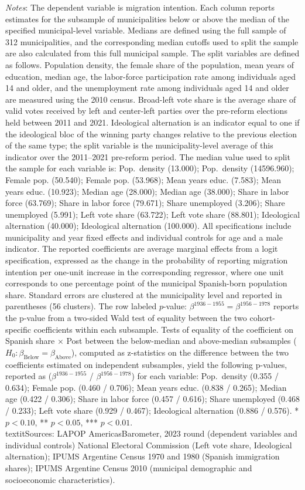 \begin{table}[!h]
\caption*{\footnotesize \textit{Notes}: The dependent variable is migration intention. Each column reports estimates for the subsample of municipalities below or above the median of the specified municipal-level variable. Medians are defined using the full sample of 312 municipalities, and the corresponding median cutoffs used to split the sample are also calculated from this full municipal sample. The split variables are defined as follows. Population density, the female share of the population, mean years of education, median age, the labor-force participation rate among individuals aged 14 and older, and the unemployment rate among individuals aged 14 and older are measured using the 2010 census. Broad-left vote share is the average share of valid votes received by left and center-left parties over the pre-reform elections held between 2011 and 2021. Ideological alternation is an indicator equal to one if the ideological bloc of the winning party changes relative to the previous election of the same type; the split variable is the municipality-level average of this indicator over the 2011--2021 pre-reform period. The median value used to split the sample for each variable is: Pop.\ density (13.000); Pop.\ density (14596.960); Female pop. (50.540); Female pop. (53.968); Mean years educ. (7.583); Mean years educ. (10.923); Median age (28.000); Median age (38.000); Share in labor force (63.769); Share in labor force (79.671); Share unemployed (3.206); Share unemployed (5.991); Left vote share (63.722); Left vote share (88.801); Ideological alternation (40.000); Ideological alternation (100.000). All specifications include municipality and year fixed effects and individual controls for age and a male indicator. The reported coefficients are average marginal effects from a logit specification, expressed as the change in the probability of reporting migration intention per one-unit increase in the corresponding regressor, where one unit corresponds to one percentage point of the municipal Spanish-born population share. Standard errors are clustered at the municipality level and reported in parentheses (56 clusters). The row labeled $p$-value: $\beta^{1936-1955} = \beta^{1956-1978}$ reports the p-value from a two-sided Wald test of equality between the two cohort-specific coefficients within each subsample. Tests of equality of the coefficient on Spanish share $\times$ Post between the below-median and above-median subsamples ($H_0: \beta_{\text{Below}} = \beta_{\text{Above}}$), computed as z-statistics on the difference between the two coefficients estimated on independent subsamples, yield the following p-values, reported as ($\beta^{1936-1955}$ / $\beta^{1956-1978}$) for each variable: Pop.\ density (0.355 / 0.634); Female pop. (0.460 / 0.706); Mean years educ. (0.838 / 0.265); Median age (0.422 / 0.306); Share in labor force (0.457 / 0.616); Share unemployed (0.468 / 0.233); Left vote share (0.929 / 0.467); Ideological alternation (0.886 / 0.576). * $p<0.10$, ** $p<0.05$, *** $p<0.01$. \\textit{Sources}:  LAPOP AmericasBarometer, 2023 round (dependent variables and individual controls) National Electoral Commission (Left vote share, Ideological alternation); IPUMS Argentine Census 1970 and 1980 (Spanish immigration shares); IPUMS Argentine Census 2010 (municipal demographic and socioeconomic characteristics).}
\end{table}
